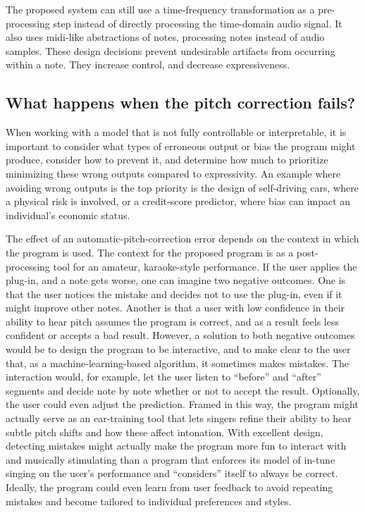 The proposed system can still use a time-frequency transformation as a pre-processing step instead of directly processing the time-domain audio signal. It also uses \gls{midi}-like abstractions of notes, processing notes instead of audio samples. These design decisions prevent undesirable artifacts from occurring within a note. They increase control, and decrease expressiveness. 

\subsection{What happens when the pitch correction fails?}
When working with a model that is not fully controllable or interpretable, it is important to consider what types of erroneous output or bias the program might produce, consider how to prevent it, and determine how much to prioritize minimizing these wrong outputs compared to expressivity. An example where avoiding wrong outputs is the top priority is the design of self-driving cars, where a physical risk is involved, or a credit-score predictor, where bias can impact an individual's economic status. 

The effect of an automatic-pitch-correction error depends on the context in which the program is used. The context for the proposed program is as a post-processing tool for an amateur, karaoke-style performance. If the user applies the plug-in, and a note gets worse, one can imagine two negative outcomes. One is that the user notices the mistake and decides not to use the plug-in, even if it might improve other notes. Another is that a user with low confidence in their ability to hear pitch assumes the program is correct, and as a result feels less confident or accepts a bad result. However, a solution to both negative outcomes would be to design the program to be interactive, and to make clear to the user that, as a machine-learning-based algorithm, it sometimes makes mistakes. The interaction would, for example, let the user listen to ``before'' and ``after'' segments and decide note by note whether or not to accept the result. Optionally, the user could even adjust the prediction. Framed in this way, the program might actually serve as an ear-training tool that lets singers refine their ability to hear subtle pitch shifts and how these affect intonation. With excellent design, detecting mistakes might actually make the program more fun to interact with and musically stimulating than a program that enforces its model of in-tune singing on the user's performance and ``considers'' itself to always be correct. Ideally, the program could even learn from user feedback to avoid repeating mistakes and become tailored to individual preferences and styles.

